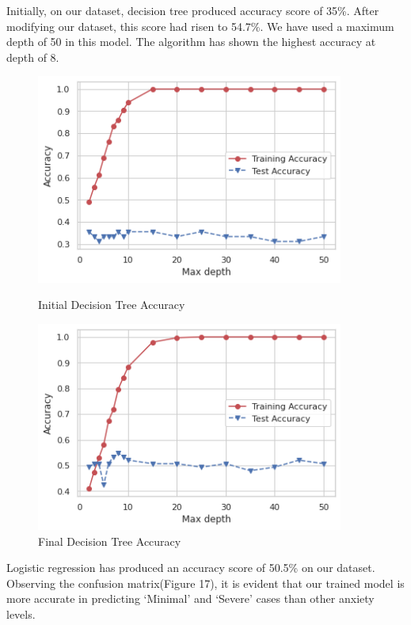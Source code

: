 \documentclass[12pt, english]{article}
\begin{document}
Initially, on our dataset, decision tree produced accuracy score of 35\%. After modifying our dataset, this score had risen to 54.7\%. We have used a maximum depth of 50 in this model. The algorithm has shown the highest accuracy at depth of 8.  
\begin{figure}[h]
    \centering
    \begin{minipage}{0.45\textwidth}
        \centering
        \includegraphics[width=0.9\textwidth]{images/dt_first.png} %
        \caption{Initial Decision Tree Accuracy}
    \end{minipage}\hfill
    \begin{minipage}{0.45\textwidth}
        \centering
        \includegraphics[width=0.9\textwidth]{images/dt_final.png} %
        \caption{Final Decision Tree Accuracy}
    \end{minipage}
\end{figure}

Logistic regression has produced an accuracy score of 50.5\% on our dataset. Observing the confusion matrix(Figure 17), it is evident that our trained model is more accurate in predicting ‘Minimal’ and ‘Severe’ cases than other anxiety levels. 
\end{document}
